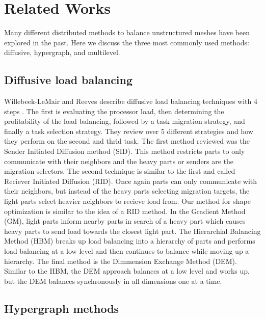 \documentclass{thesis}
\begin{document}
\chapter{Related Works}

Many different distributed methods to balance unstructured meshes have been explored in the 
past. Here we discuss the three most commonly used methods: diffusive, hypergraph, 
and multilevel.

\section{Diffusive load balancing}
Willebeek-LeMair and Reeves describe diffusive load balancing techniques with 
4 steps \cite{loadbalance}. The first is evaluating the processor load, then 
determining the profitability of the load balancing, followed by a task 
migration strategy, and finally a task selection strategy. They review over 5 
different strategies and how they perform on the second and thrid task. The first 
method reviewed was the Sender Initiated Diffusion method (SID). This method 
restricts parts to only communicate with their neighbors and the heavy parts or 
senders are the migration selectors. The second technique is similar to the first 
and called Reciever Initiated Diffusion (RID). Once again parts can only 
communicate with their neighbors, but instead of the heavy parts selecting 
migration targets, the light parts select heavier neighbors to recieve load from. 
Our method for shape optimization is similar to the idea of a RID method. In the 
Gradient Method (GM), light parts inform nearby parts in search of a heavy part 
which causes heavy parts to send load towards the closest light part. The 
Hierarchial Balancing Method (HBM) breaks up load balancing into a hierarchy of 
parts and performs load balancing at a low level and then continues to balance 
while moving up a hierarchy. The final method is the Dimmension Exchange Method
 (DEM). Similar to the HBM, the DEM approach balances at a low level and works 
up, but the DEM balances synchronously in all dimensions one at a time.

\section{Hypergraph methods}
\end{document}
